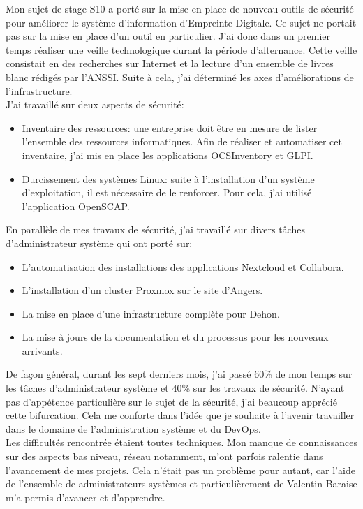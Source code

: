 \documentclass[12pt, a4paper, twoside]{article}
\begin{document}
Mon sujet de stage S10 a porté sur la mise en place de nouveau outils de sécurité pour améliorer le système d'information d'Empreinte Digitale.
Ce sujet ne portait pas sur la mise en place d'un outil en particulier.
J'ai donc dans un premier temps réaliser une veille technologique durant la période d'alternance.
Cette veille consistait en des recherches sur Internet et la lecture d'un ensemble de livres blanc rédigés par l'\gls{ANSSI}.
Suite à cela, j'ai déterminé les axes d'améliorations de l'infrastructure. \\

J'ai travaillé sur deux aspects de sécurité: 
\begin{itemize}
    \item Inventaire des ressources: une entreprise doit être en mesure de lister l'ensemble des ressources informatiques.
    Afin de réaliser et automatiser cet inventaire, j'ai mis en place les applications \gls{OCSInventory} et \gls{GLPI}.
    \item Durcissement des systèmes \gls{Linux}: suite à l'installation d'un système d'exploitation, il est nécessaire de le renforcer.
    Pour cela, j'ai utilisé l'application \gls{OpenSCAP}.
\end{itemize} 

En parallèle de mes travaux de sécurité, j'ai travaillé sur divers tâches d'administrateur système qui ont porté sur:
\begin{itemize}
    \item L'automatisation des installations des applications \gls{Nextcloud} et \gls{Collabora}.
    \item L'installation d'un cluster \gls{Proxmox} sur le site d'Angers.
    \item La mise en place d'une infrastructure complète pour Dehon.
    \item La mise à jours de la documentation et du processus pour les nouveaux arrivants.
\end{itemize} 

De façon général, durant les sept derniers mois, j'ai passé 60\% de mon temps sur les tâches d'administrateur système et 40\% sur les travaux de sécurité.
N'ayant pas d'appétence particulière sur le sujet de la sécurité, j'ai beaucoup apprécié cette bifurcation.
Cela me conforte dans l'idée que je souhaite à l'avenir travailler dans le domaine de l'administration système et du \gls{DevOps}.\\

Les difficultés rencontrée étaient toutes techniques.
Mon manque de connaissances sur des aspects bas niveau, réseau notamment, m'ont parfois ralentie dans l'avancement de mes projets.
Cela n'était pas un problème pour autant, car l'aide de l'ensemble de administrateurs systèmes et particulièrement de Valentin Baraise m'a permis d'avancer et d'apprendre.
\end{document}
